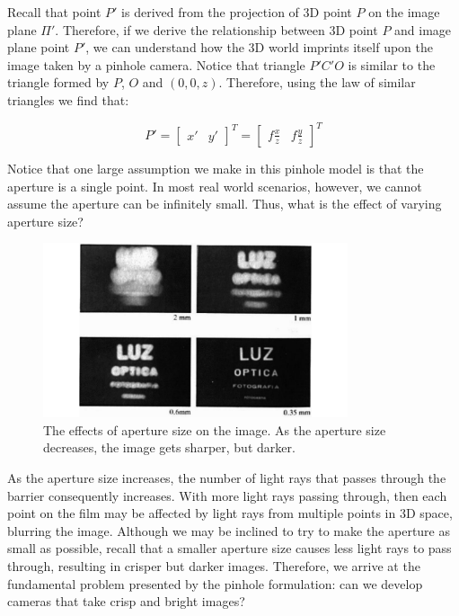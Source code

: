 \documentclass[a4paper, 12pt]{article}
\begin{document}
Recall that point $P'$ is derived from the projection of 3D point $P$ on the image plane $\Pi'$. Therefore, if we derive the relationship between 3D point $P$ and image plane point $P'$, we can understand how the 3D world imprints itself upon the image taken by a pinhole camera. Notice that triangle $P'C'O$ is similar to the triangle formed by $P$, $O$ and $(0,0,z)$. Therefore, using the law of similar triangles we find that:

\begin{equation}
    P' = \begin{bmatrix}x'&y'\end{bmatrix}^T = \begin{bmatrix}f\frac{x}{z} & f\frac{y}{z}\end{bmatrix}^T
\end{equation}

Notice that one large assumption we make in this pinhole model is that the aperture is a single point. In most real world scenarios, however, we cannot assume the aperture can be infinitely small. Thus, what is the effect of varying aperture size? 

\begin{figure}[h!]
\centering
\includegraphics[width=0.8\textwidth]{figures/1-3.pdf}
\caption{The effects of aperture size on the image. As the aperture size decreases, the image gets sharper, but darker.}
\label{fig:apertureSize}
\end{figure}

As the aperture size increases, the number of light rays that passes through the barrier consequently increases. With more light rays passing through, then each point on the film may be affected by light rays from multiple points in 3D space, blurring the image. Although we may be inclined to try to make the aperture as small as possible, recall that a smaller aperture size causes less light rays to pass through, resulting in crisper but darker images. Therefore, we arrive at the fundamental problem presented by the pinhole formulation: can we develop cameras that take crisp and bright images?
\end{document}
